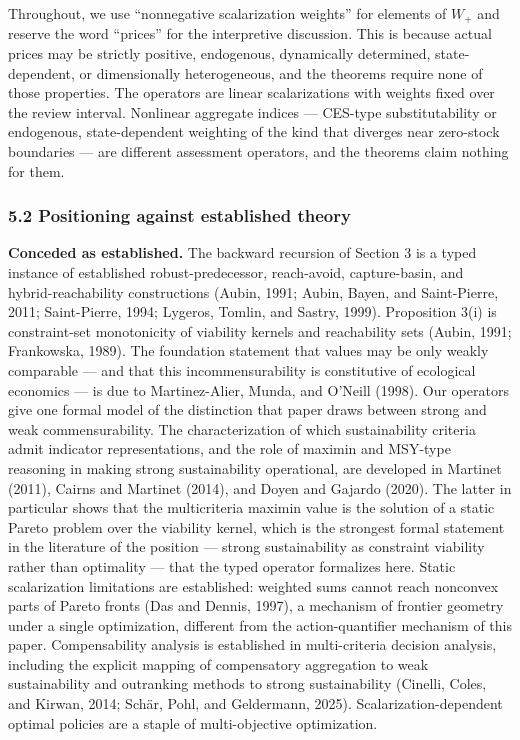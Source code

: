 \documentclass[11pt]{article}
\begin{document}
Throughout, we use ``nonnegative scalarization weights'' for elements of
\(W_+\) and reserve the word ``prices'' for the interpretive discussion.
This is because actual prices may be strictly positive, endogenous,
dynamically determined, state-dependent, or dimensionally heterogeneous,
and the theorems require none of those properties. The operators are
linear scalarizations with weights fixed over the review interval.
Nonlinear aggregate indices --- CES-type substitutability or endogenous,
state-dependent weighting of the kind that diverges near zero-stock
boundaries --- are different assessment operators, and the theorems
claim nothing for them.

\subsubsection{5.2 Positioning against established
theory}\label{positioning-against-established-theory}

\textbf{Conceded as established.} The backward recursion of Section 3 is
a typed instance of established robust-predecessor, reach-avoid,
capture-basin, and hybrid-reachability constructions (Aubin, 1991;
Aubin, Bayen, and Saint-Pierre, 2011; Saint-Pierre, 1994; Lygeros,
Tomlin, and Sastry, 1999). Proposition 3(i) is constraint-set
monotonicity of viability kernels and reachability sets (Aubin, 1991;
Frankowska, 1989). The foundation statement that values may be only
weakly comparable --- and that this incommensurability is constitutive
of ecological economics --- is due to Martinez-Alier, Munda, and O'Neill
(1998). Our operators give one formal model of the distinction that
paper draws between strong and weak commensurability. The
characterization of which sustainability criteria admit indicator
representations, and the role of maximin and MSY-type reasoning in
making strong sustainability operational, are developed in Martinet
(2011), Cairns and Martinet (2014), and Doyen and Gajardo (2020). The
latter in particular shows that the multicriteria maximin value is the
solution of a static Pareto problem over the viability kernel, which is
the strongest formal statement in the literature of the position ---
strong sustainability as constraint viability rather than optimality ---
that the typed operator formalizes here. Static scalarization
limitations are established: weighted sums cannot reach nonconvex parts
of Pareto fronts (Das and Dennis, 1997), a mechanism of frontier
geometry under a single optimization, different from the
action-quantifier mechanism of this paper. Compensability analysis is
established in multi-criteria decision analysis, including the explicit
mapping of compensatory aggregation to weak sustainability and
outranking methods to strong sustainability (Cinelli, Coles, and Kirwan,
2014; Sch\"ar, Pohl, and Geldermann, 2025). Scalarization-dependent
optimal policies are a staple of multi-objective optimization.
\end{document}
